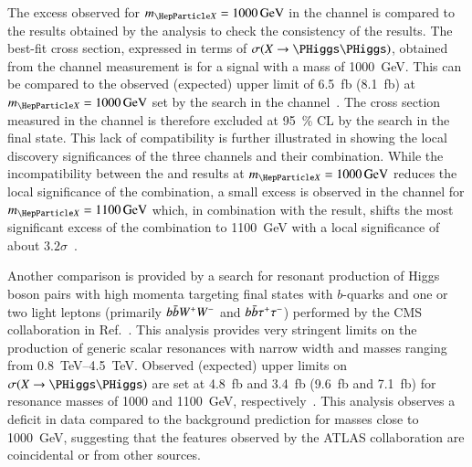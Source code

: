 The excess observed for $\mX = \SI{1000}{\GeV}$ in the \bbtautau channel is
compared to the results obtained by the \bbbb analysis to check the consistency
of the results. The best-fit cross section, expressed in terms of
$\sigma(X \to \HH)$, obtained from the \bbtautau channel measurement is
 for a signal with a mass of
\SI{1000}{\GeV}. This can be compared to the observed (expected) upper limit of
\SI{6.5}{\femto\barn} (\SI{8.1}{\femto\barn}) at $\mX = \SI{1000}{\GeV}$ set by
the search in the \bbbb channel~\cite{HDBS-2018-41,hepdata.111124}. The cross
section measured in the \bbtautau channel is therefore excluded at
\SI{95}{\percent} CL by the search in the \bbbb final state. This lack of
compatibility is further illustrated in 
showing the local discovery significances of the three channels and their
combination. While the incompatibility between the \bbtautau and \bbbb results
at $\mX = \SI{1000}{\GeV}$ reduces the local significance of the combination, a
small excess is observed in the \bbbb channel for $\mX = \SI{1100}{\GeV}$ which,
in combination with the \bbtautau result, shifts the most significant excess of
the combination to \SI{1100}{\GeV} with a local significance of about
$3.2 \sigma$~\cite{ATLAS-CONF-2021-052}.








Another comparison is provided by a search for resonant production of Higgs
boson pairs with high momenta targeting final states with $b$-quarks and one or
two light leptons (primarily $b\bar{b} W^+ W^-$ and $b\bar{b} \tau^+ \tau^-$)
performed by the CMS collaboration in Ref.~\cite{CMS-B2G-20-007}. This analysis
provides very stringent limits on the production of generic scalar resonances
with narrow width and masses ranging from \SIrange{0.8}{4.5}{\TeV}. Observed
(expected) upper limits on $\sigma(X \to \HH)$ are set at \SI{4.8}{\femto\barn}
and \SI{3.4}{\femto\barn} (\SI{9.6}{\femto\barn} and \SI{7.1}{\femto\barn}) for
resonance masses of \num{1000} and \SI{1100}{\GeV},
respectively~\cite{CMS-B2G-20-007,hepdata.115024}. This analysis observes a
deficit in data compared to the background prediction for masses close to
\SI{1000}{\GeV}, suggesting that the features observed by the ATLAS
collaboration are coincidental or from other sources.


